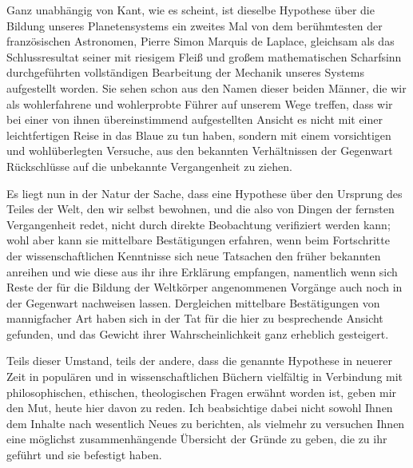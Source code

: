 \documentclass[a4paper, 11pt, oneside, german]{article}
\begin{document}
Ganz unabhängig von Kant, wie es scheint, ist dieselbe Hypothese über die Bildung unseres Planetensystems ein zweites Mal von dem berühmtesten der französischen Astronomen, Pierre Simon Marquis de Laplace, gleichsam als das Schlussresultat seiner mit riesigem Fleiß und großem mathematischen Scharfsinn durchgeführten vollständigen Bearbeitung der Mechanik unseres Systems aufgestellt worden. Sie sehen schon aus den Namen dieser beiden Männer, die wir als wohlerfahrene und wohlerprobte Führer auf unserem Wege treffen, dass wir bei einer von ihnen übereinstimmend aufgestellten Ansicht es nicht mit einer leichtfertigen Reise in das Blaue zu tun haben, sondern mit einem vorsichtigen und wohlüberlegten Versuche, aus den bekannten Verhältnissen der Gegenwart Rückschlüsse auf die unbekannte Vergangenheit zu ziehen.

Es liegt nun in der Natur der Sache, dass eine Hypothese über den Ursprung des Teiles der Welt, den wir selbst bewohnen, und die also von Dingen der fernsten Vergangenheit redet, nicht durch direkte Beobachtung verifiziert werden kann; wohl aber kann sie mittelbare Bestätigungen erfahren, wenn beim Fortschritte der wissenschaftlichen Kenntnisse sich neue Tatsachen den früher bekannten anreihen und wie diese aus ihr ihre Erklärung empfangen, namentlich wenn sich Reste der für die Bildung der Weltkörper angenommenen Vorgänge auch noch in der Gegenwart nachweisen lassen. Dergleichen mittelbare Bestätigungen von mannigfacher Art haben sich in der Tat für die hier zu besprechende Ansicht gefunden, und das Gewicht ihrer Wahrscheinlichkeit ganz erheblich gesteigert.

Teils dieser Umstand, teils der andere, dass die genannte Hypothese in neuerer Zeit in populären und in wissenschaftlichen Büchern vielfältig in Verbindung mit philosophischen, ethischen, theologischen Fragen erwähnt worden ist, geben mir den Mut, heute hier davon zu reden. Ich beabsichtige dabei nicht sowohl Ihnen dem Inhalte nach wesentlich Neues zu berichten, als vielmehr zu versuchen Ihnen eine möglichst zusammenhängende Übersicht der Gründe zu geben, die zu ihr geführt und sie befestigt haben.
\end{document}
